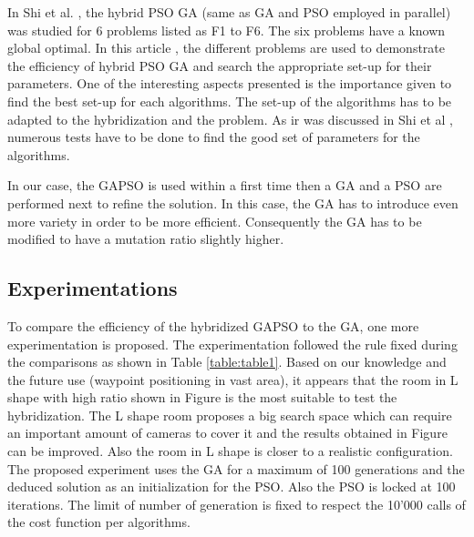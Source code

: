In Shi et al. \cite{77*shi2005}, the hybrid PSO GA (same as GA and PSO employed in parallel) was studied for 6  problems listed as F1 to F6. The six problems have a known global optimal. In this article \cite{77*shi2005}, the different problems are used to demonstrate the efficiency of hybrid PSO GA and search the appropriate set-up for their parameters. One of the interesting aspects presented is the importance given to find the best set-up for each algorithms. 
The set-up of the algorithms has to be adapted to the hybridization and the problem. As ir was discussed in Shi et al \cite{77*shi2005}, numerous tests have to be done to find the good set of parameters for the algorithms.

 In our case, the GAPSO is used within a first time then a GA and a PSO are performed next to refine the solution. In this case, the GA has to introduce even more variety in order to be more efficient. Consequently the GA has to be modified to have a mutation ratio slightly higher.   



\subsection{Experimentations }
To compare the efficiency of the hybridized GAPSO to the GA, one more experimentation is proposed.
The experimentation followed the rule fixed during the comparisons as shown in Table \ref{table:table1}. %
Based on our knowledge and the future use (waypoint positioning in vast area), it appears that the room in L shape with high ratio shown in Figure  is the most suitable to test the hybridization.  %
The L shape room proposes a big search space which can require an important amount of cameras to cover it and the results obtained in Figure  can be improved. Also the room in L shape  is closer to a realistic configuration.  %
The proposed experiment uses the GA for a maximum of 100 generations and the deduced solution as an initialization for the PSO. Also the PSO is locked at 100 iterations.  The limit of  number of generation is fixed to respect the 10'000 calls  of the cost function per algorithms.%


